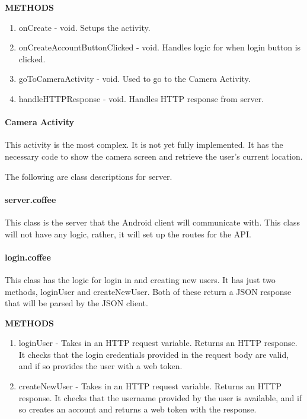 \documentclass[11pt,a4paper,titlepage]{article}
\begin{document}
\textbf{METHODS}
\begin{enumerate}
  \item onCreate - void. Setups the activity.
  \item onCreateAccountButtonClicked - void. Handles logic for when login button is clicked.
  \item goToCameraActivity - void. Used to go to the Camera Activity.
  \item handleHTTPResponse - void. Handles HTTP response from server.
\end{enumerate}

\paragraph{Camera Activity\\}
This activity is the most complex. It is not yet fully implemented. It has the necessary code to show the camera screen and retrieve the user's current location.

The following are class descriptions for server.

\paragraph{server.coffee\\}
This class is the server that the Android client will communicate with. This class will not have any logic, rather, it will set up the routes for the API. 

\paragraph{login.coffee\\}
This class has the logic for login in and creating new users. It has just two methods, loginUser and createNewUser. Both of these return a JSON response that will be parsed by the JSON client.

\textbf{METHODS}
\begin{enumerate}
  \item loginUser - Takes in an HTTP request variable. Returns an HTTP response. It checks that the login credentials provided in the request body are valid, and if so provides the user with a web token.
  \item createNewUser - Takes in an HTTP request variable. Returns an HTTP response. It checks that the username provided by the user is available, and if so creates an account and returns a web token with the response.
\end{enumerate}
\end{document}
